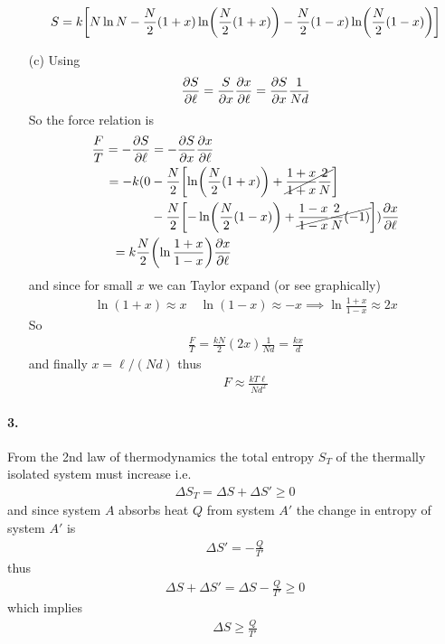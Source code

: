 \documentclass[../main.tex]{subfiles}
\begin{document}
\begin{itemize}
\begin{align*}
{            S = k \qt[N \ln N - \frac{N}{2}(1 + x) \ln(\frac{N}{2}(1 + x)) - \frac{N}{2}(1 - x) \ln(\frac{N}{2}(1 - x))]
        }
    \end{align*}
    \newpage
    \item [(c)] Using
    \begin{align*}
        \pdv{S}{\ell} = \frac{S}{\partial x} \pdv{x}{\ell} = \pdv{S}{x} \frac{1}{Nd} 
    \end{align*}
    So the force relation is
    \begin{align*}
        \frac{F}{T} = -\pdv{S}{\ell} &= -\pdv{S}{x} \pdv{x}{\ell} \\
        = -k(
            0 &- \frac{N}{2} \qt[
                \ln(\frac{N}{2}(1 + x)) + \cancel{\frac{1 + x}{1 + x} \frac{2}{N}}
            ] \\ &- \frac{N}{2} \qt[
                -\ln(\frac{N}{2}(1 - x)) + \cancel{\frac{1 - x}{1 - x} \frac{2}{N} (-1)}
            ]
        ) \pdv{x}{\ell} \\
        = k \frac{N}{2} &\qt(\ln \frac{1 + x}{1 - x}) \pdv{x}{\ell} 
    \end{align*}
    and since for small $x$ we can Taylor expand (or see graphically)
    \begin{align*}
        \ln (1 + x) \approx x \quad \ln (1 - x) \approx -x
        \implies \ln \frac{1 + x}{1 - x} \approx 2x
    \end{align*}
    So
    \begin{align*}
        \frac{F}{T} = \frac{kN}{2} (2x) \frac{1}{Nd} = \frac{kx}{d}
    \end{align*}
    and finally $x = \ell/(Nd)$ thus
    \begin{align*}
        \boxed{
            F \approx \frac{kT\ell}{Nd^2}
        }
    \end{align*}
\end{itemize}

\newpage
\paragraph{3.}
From the 2nd law of thermodynamics the total entropy $S_T$ of the thermally isolated system must increase i.e.
\begin{align*}
    \Delta S_T = \Delta S + \Delta S' \geq 0
\end{align*}
and since system $A$ absorbs heat $Q$ from system $A'$ the change in entropy of system $A'$ is
\begin{align*}
    \Delta S' = -\frac{Q}{T'}
\end{align*}
thus
\begin{align*}
    \Delta S + \Delta S' = \Delta S - \frac{Q}{T'} \geq 0
\end{align*}
which implies
\begin{align*}
    \boxed{
        \Delta S \geq \frac{Q}{T'}
    }
\end{align*}
\end{document}
